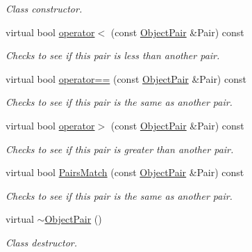 \begin{DoxyCompactItemize}
\begin{DoxyCompactList}\small\item\em Class constructor. \item\end{DoxyCompactList}\item 
virtual bool \hyperlink{classMezzanine_1_1ObjectPair_ae0f6ec9e02fa5e585988d8715f61eccf}{operator$<$} (const \hyperlink{classMezzanine_1_1ObjectPair}{ObjectPair} \&Pair) const 
\begin{DoxyCompactList}\small\item\em Checks to see if this pair is less than another pair. \item\end{DoxyCompactList}\item 
virtual bool \hyperlink{classMezzanine_1_1ObjectPair_a9ef3a1e9a43bd16c0cd9e9db5713dd87}{operator==} (const \hyperlink{classMezzanine_1_1ObjectPair}{ObjectPair} \&Pair) const 
\begin{DoxyCompactList}\small\item\em Checks to see if this pair is the same as another pair. \item\end{DoxyCompactList}\item 
virtual bool \hyperlink{classMezzanine_1_1ObjectPair_a6dd31a9481a2e6fc8893241f1481173c}{operator$>$} (const \hyperlink{classMezzanine_1_1ObjectPair}{ObjectPair} \&Pair) const 
\begin{DoxyCompactList}\small\item\em Checks to see if this pair is greater than another pair. \item\end{DoxyCompactList}\item 
virtual bool \hyperlink{classMezzanine_1_1ObjectPair_aacdc52e1c01f8c4a93323443dfde2059}{PairsMatch} (const \hyperlink{classMezzanine_1_1ObjectPair}{ObjectPair} \&Pair) const 
\begin{DoxyCompactList}\small\item\em Checks to see if this pair is the same as another pair. \item\end{DoxyCompactList}\item 
\hypertarget{classMezzanine_1_1ObjectPair_a242416fb24217acb1eed16daddc7c194}{
virtual \hyperlink{classMezzanine_1_1ObjectPair_a242416fb24217acb1eed16daddc7c194}{$\sim$ObjectPair} ()}
\label{classMezzanine_1_1ObjectPair_a242416fb24217acb1eed16daddc7c194}

\begin{DoxyCompactList}\small\item\em Class destructor. \item\end{DoxyCompactList}\end{DoxyCompactItemize}
